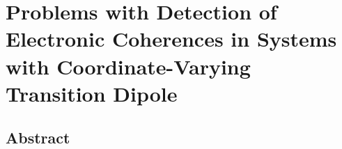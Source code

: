 \chapter{Problems with Detection of Electronic Coherences in Systems with Coordinate-Varying Transition Dipole}\label{ch:nonCondon}
\thispagestyle{plain}
\vspace{-.5cm}


\section*{Abstract}
    \dsp
    


